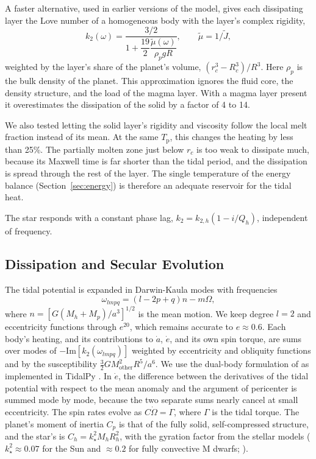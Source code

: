 \documentclass[11pt]{article}
\newcommand{\Tp}{T_\mathrm{p}}
\begin{document}
A faster alternative, used in earlier versions of the model, gives each dissipating layer the Love number of a homogeneous body with the layer's complex rigidity,
\begin{equation}
k_2(\omega) = \frac{3/2}{1 + \dfrac{19}{2} \dfrac{\tilde{\mu}(\omega)}{\rho_p g R}}, \qquad \tilde{\mu} = 1 / \tilde{J},
\end{equation}
weighted by the layer's share of the planet's volume, $(r_c^3 - R_c^3) / R^3$. Here $\rho_p$ is the bulk density of the planet. This approximation ignores the fluid core, the density structure, and the load of the magma layer. With a magma layer present it overestimates the dissipation of the solid by a factor of 4 to 14.

We also tested letting the solid layer's rigidity and viscosity follow the local melt fraction instead of its mean. At the same $\Tp$, this changes the heating by less than 25\%. The partially molten zone just below $r_c$ is too weak to dissipate much, because its Maxwell time is far shorter than the tidal period, and the dissipation is spread through the rest of the layer. The single temperature of the energy balance (Section~\ref{sec:energy}) is therefore an adequate reservoir for the tidal heat.

The star responds with a constant phase lag, $k_2 = k_{2,h}(1 - i / Q_h)$, independent of frequency.

\subsection{Dissipation and Secular Evolution}

The tidal potential is expanded in Darwin-Kaula modes with frequencies \citep{Kaula1964,Renaud2021}
\begin{equation}
\omega_{lmpq} = (l - 2p + q) n - m \Omega,
\end{equation}
where $n = [G (M_h + M_p) / a^3]^{1/2}$ is the mean motion. We keep degree $l = 2$ and eccentricity functions through $e^{20}$, which remains accurate to $e \approx 0.6$. Each body's heating, and its contributions to $\dot{a}$, $\dot{e}$, and its own spin torque, are sums over modes of $-\mathrm{Im}[k_2(\omega_{lmpq})]$ weighted by eccentricity and obliquity functions and by the susceptibility $\tfrac{3}{2} G M_\mathrm{other}^2 R^5 / a^6$. We use the dual-body formulation of \citet{Boue2019} as implemented in TidalPy \citep{Renaud2021}. In $\dot{e}$, the difference between the derivatives of the tidal potential with respect to the mean anomaly and the argument of pericenter is summed mode by mode, because the two separate sums nearly cancel at small eccentricity. The spin rates evolve as $C \dot{\Omega} = \Gamma$, where $\Gamma$ is the tidal torque. The planet's moment of inertia $C_p$ is that of the fully solid, self-compressed structure, and the star's is $C_h = k_\star^2 M_h R_h^2$, with the gyration factor from the stellar models ($k_\star^2 \approx 0.07$ for the Sun and $\approx 0.2$ for fully convective M dwarfs; \citealt{Baraffe2015}).
\end{document}

